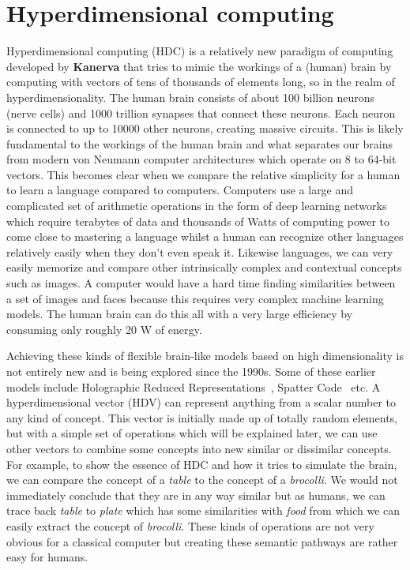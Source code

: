 \section{Hyperdimensional computing}
Hyperdimensional computing (HDC) is a relatively new paradigm of computing developed by \textbf{Kanerva} \cite{Kanerva2009} that tries to mimic the workings of a (human) brain by computing with vectors of tens of thousands of elements long, so in the realm of hyperdimensionality. The human brain consists of about 100 billion neurons (nerve cells) and 1000 trillion synapses that connect these neurons. Each neuron is connected to up to 10000 other neurons, creating massive circuits. This is likely fundamental to the workings of the human brain and what separates our brains from modern von Neumann computer architectures which operate on 8 to 64-bit vectors. This becomes clear when we compare the relative simplicity for a human to learn a language compared to computers. Computers use a large and complicated set of arithmetic operations in the form of deep learning networks which require terabytes of data and thousands of Watts of computing power to come close to mastering a language whilst a human can recognize other languages relatively easily when they don't even speak it. Likewise languages, we can very easily memorize and compare other intrinsically complex and contextual concepts such as images. A computer would have a hard time finding similarities between a set of images and faces because this requires very complex machine learning models. The human brain can do this all with a very large efficiency by consuming only roughly 20 W of energy.

Achieving these kinds of flexible brain-like models based on high dimensionality is not entirely new and is being explored since the 1990s. Some of these earlier models include Holographic Reduced Representations~\cite{HRR}, Spatter Code~\cite{spatter} etc. A hyperdimensional vector (HDV) can represent anything from a scalar number to any kind of concept. This vector is initially made up of totally random elements, but with a simple set of operations which will be explained later, we can use other vectors to combine some concepts into new similar or dissimilar concepts. For example, to show the essence of HDC and how it tries to simulate the brain, we can compare the concept of a \textit{table} to the concept of a \textit{brocolli}. We would not immediately conclude that they are in any way similar but as humans, we can trace back \textit{table} to \textit{plate} which has some similarities with \textit{food} from which we can easily extract the concept of \textit{brocolli}. These kinds of operations are not very obvious for a classical computer but creating these semantic pathways are rather easy for humans.

